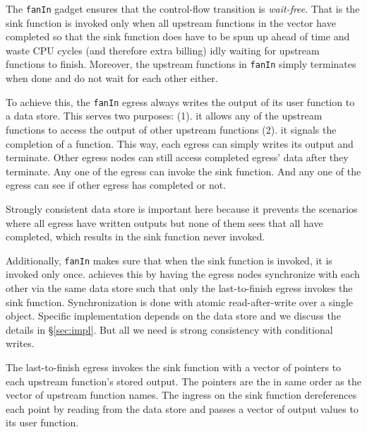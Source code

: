 %


The \texttt{fanIn} gadget ensures that the control-flow transition is
\emph{wait-free}. That is the sink function is invoked only when all upstream
functions in the vector have completed so that the sink function does have to
be spun up ahead of time and waste CPU cycles (and therefore extra billing)
idly waiting for upstream functions to finish. Moreover, the upstream
functions in \texttt{fanIn} simply terminates when done and do not wait for
each other either.

To achieve this, the \texttt{fanIn} egress always writes the output of its
user function to a data store. This serves two purposes: (1). it allows any of
the upstream functions to access the output of other upstream functions (2).
it signals the completion of a function. This way, each egress can simply
writes its output and terminate. Other egress nodes can still access completed
egress' data after they terminate. Any one of the egress can invoke the sink
function. And any one of the egress can see if other egress has completed or
not. 

Strongly consistent data store is important here because it prevents the
scenarios where all egress have written outputs but none of them sees that all
have completed, which results in the sink function never invoked.

Additionally, \texttt{fanIn} makes sure that when the sink function is
invoked, it is invoked only once. \name{} achieves this by having the egress
nodes synchronize with each other via the same data store such that only the
last-to-finish egress invokes the sink function. Synchronization is done with
atomic read-after-write over a single object. Specific implementation depends
on the data store and we discuss the details in \S\ref{sec:impl}. But all we
need is strong consistency with conditional writes.

The last-to-finish egress invokes the sink function with a vector of pointers
to each upstream function's stored output. The pointers are the in same order
as the vector of upstream function names. The ingress on the sink function
dereferences each point by reading from the data store and passes a vector of
output values to its user function.

